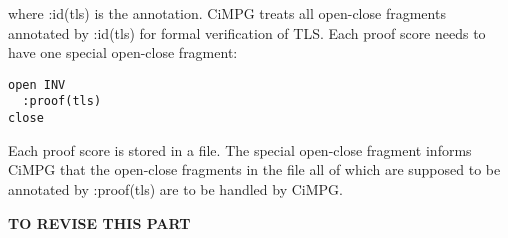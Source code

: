 \documentclass[a4paper,fleqn]{cas-dc}
\begin{document}
where :id(tls) is the annotation. CiMPG treats all open-close fragments annotated by :id(tls) for formal verification of TLS. Each proof score needs to have one special open-close fragment:
\begin{small}
\begin{verbatim}
open INV
  :proof(tls)
close
\end{verbatim}
\end{small}
Each proof score is stored in a file. The special open-close
fragment informs CiMPG that the open-close fragments in the file
all of which are supposed to be annotated by :proof(tls) are to
be handled by CiMPG.

\textbf{TO REVISE THIS PART}





\end{document}
